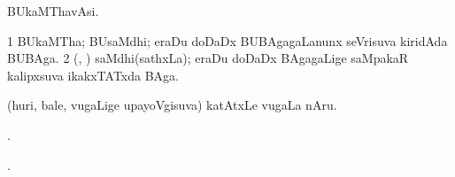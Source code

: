 \bentry
{}
\gl{\nA}
\bmng
BUkaMThavAsi. 
\emng
\eentry

\bentry
{}
\gl{\nA}
\bmng
\bnum
\num{1} BUkaMTha; BUsaMdhi; eraDu doDaDx BUBAgagaLanunx seVrisuva kiridAda BUBAga. 
\num{2} (\aMrashA, \savi) saMdhi(sathxLa); eraDu doDaDx BAgagaLige saMpakaR kalipxsuva ikakxTATxda BAga. 
\enum
\emng
\eentry

\bentry
{}
\gl{\nA}
\bmng
(huri, bale, \mo vugaLige upayoVgisuva) katAtxLe \mo vugaLa nAru. 
\emng
\eentry

\bentry
{}
\gl{\saMkiSx}
\bmng
{}. 
\emng
\eentry

\bentry
{}
\gl{\saMkiSx}
\bmng
{}. 
\emng
\eentry

